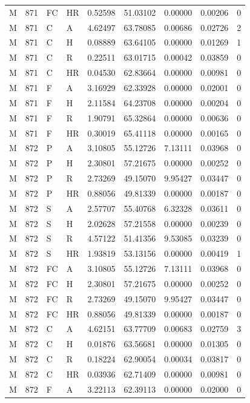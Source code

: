\begin{longtable}{lllllllll}
M & 871 & FC & HR & 0.52598 & 51.03102 & 0.00000 & 0.00206 & 0\\
M & 871 & C & A & 4.62497 & 63.78085 & 0.00686 & 0.02726 & 2\\
M & 871 & C & H & 0.08889 & 63.64105 & 0.00000 & 0.01269 & 1\\
M & 871 & C & R & 0.22511 & 63.01715 & 0.00042 & 0.03859 & 0\\
M & 871 & C & HR & 0.04530 & 62.83664 & 0.00000 & 0.00981 & 0\\
M & 871 & F & A & 3.16929 & 62.33928 & 0.00000 & 0.02001 & 0\\
M & 871 & F & H & 2.11584 & 64.23708 & 0.00000 & 0.00204 & 0\\
M & 871 & F & R & 1.90791 & 65.32864 & 0.00000 & 0.00636 & 0\\
M & 871 & F & HR & 0.30019 & 65.41118 & 0.00000 & 0.00165 & 0\\
M & 872 & P & A & 3.10805 & 55.12726 & 7.13111 & 0.03968 & 0\\
M & 872 & P & H & 2.30801 & 57.21675 & 0.00000 & 0.00252 & 0\\
M & 872 & P & R & 2.73269 & 49.15070 & 9.95427 & 0.03447 & 0\\
M & 872 & P & HR & 0.88056 & 49.81339 & 0.00000 & 0.00187 & 0\\
M & 872 & S & A & 2.57707 & 55.40768 & 6.32328 & 0.03611 & 0\\
M & 872 & S & H & 2.02628 & 57.21558 & 0.00000 & 0.00239 & 0\\
M & 872 & S & R & 4.57122 & 51.41356 & 9.53085 & 0.03239 & 0\\
M & 872 & S & HR & 1.93819 & 53.13156 & 0.00000 & 0.00419 & 1\\
M & 872 & FC & A & 3.10805 & 55.12726 & 7.13111 & 0.03968 & 0\\
M & 872 & FC & H & 2.30801 & 57.21675 & 0.00000 & 0.00252 & 0\\
M & 872 & FC & R & 2.73269 & 49.15070 & 9.95427 & 0.03447 & 0\\
M & 872 & FC & HR & 0.88056 & 49.81339 & 0.00000 & 0.00187 & 0\\
M & 872 & C & A & 4.62151 & 63.77709 & 0.00683 & 0.02759 & 3\\
M & 872 & C & H & 0.01876 & 63.56681 & 0.00000 & 0.01305 & 0\\
M & 872 & C & R & 0.18224 & 62.90054 & 0.00034 & 0.03817 & 0\\
M & 872 & C & HR & 0.03936 & 62.71409 & 0.00000 & 0.00981 & 0\\
M & 872 & F & A & 3.22113 & 62.39113 & 0.00000 & 0.02000 & 0\\

\end{longtable}
